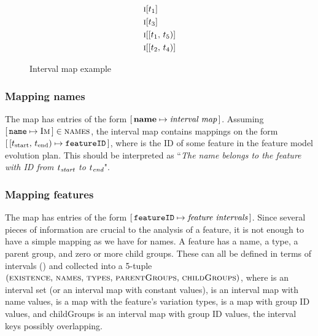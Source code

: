 \begin{figure}[h]
  \begin{align*}
    & \textsc{i}[t_1] \\
    & \textsc{i}[t_3] \\
    & \textsc{i}[[t_1,\, t_5)] \\
    & \textsc{i}[[t_2,\, t_4)]
  \end{align*}
  \caption{Interval map example}
  \label{ex:interval-map}
\end{figure}


\subsubsection{Mapping names}
\label{subsub:mapping-names}

The \names{} map has entries of the form $[\,\textbf{name}{} \mapsto \textit{interval map}\,]$. Assuming $[\,\texttt{name} \mapsto \textsc{Im}\,] \in \textsc{names}$, the interval map  contains mappings on the form $[\,[t_\text{start},\, t_\text{end}) \mapsto \texttt{featureID}\,]$, where  is the ID of some feature in the feature model evolution plan. This should be interpreted as ``\emph{The name \emph{} belongs to the feature with ID \emph{} from $t_{\emph{\text{start}}}$ to $t_{\emph{\text{end}}}$}". 

\subsubsection{Mapping features}
\label{subsub:mapping-features}


The \features{} map has entries of the form $[\,\texttt{featureID} \mapsto \textit{feature intervals}\,]$. Since several pieces of information are crucial to the analysis of a feature, it is not enough to have a simple mapping as we have for names.
A feature has a name, a type, a parent group, and zero or more child groups. 
These can all be defined in terms of intervals () and collected into a 5-tuple $(\textsc{existence},\, \textsc{names},\, \textsc{types},\, \textsc{parentGroups},\, \textsc{childGroups})$, where  is an interval set (or an interval map with constant values),  is an interval map with name values,  is a map with the feature's variation types,  is a map with group ID values, and childGroups is an interval map with group ID values, the interval keys possibly overlapping. 

